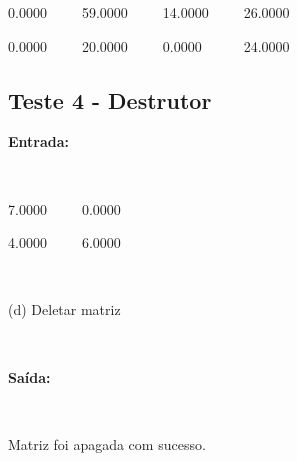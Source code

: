 \documentclass{article}
\begin{document}
0.0000~~~~~59.0000~~~~~14.0000~~~~~26.0000

0.0000~~~~~20.0000~~~~~0.0000~~~~~~24.0000

\subsection{Teste 4 - Destrutor}

\textbf{Entrada:}

~~~~~~~~~~~~~~~

7.0000~~~~~0.0000

4.0000~~~~~6.0000

~~~~~~~~~~~~~~

(d) Deletar matriz

~~~~~~~~~~~~~~

\textbf{Saída:}

~~~~~~~~~~~~~~

Matriz foi apagada com sucesso.

~~~~~~~~~~~~~~~
\end{document}

